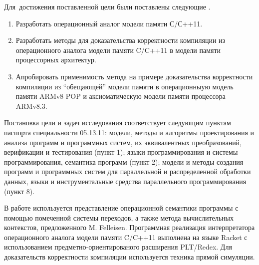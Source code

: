 Для~достижения поставленной цели были поставлены следующие {\tasks}.
\begin{enumerate}
  \item Разработать операционный аналог модели памяти С/С++11.
  \item Разработать методы для доказательства корректности компиляции из операционного аналога модели памяти C/C++11 в модели памяти
        процессорных архитектур.
  \item Апробировать применимость метода на примере доказательства корректности компиляции из ``обещающей'' модели памяти в
        операционныую модель памяти ARMv8 POP и аксиоматическую модели памяти процессора ARMv8.3.
\end{enumerate}

Постановка цели и задач исследования соответствует следующим пунктам паспорта специальности 05.13.11:
модели, методы и алгоритмы проектирования и анализа программ и программных систем, их эквивалентных преобразований, верификации и тестирования (пункт 1);
языки программирования и системы программирования, семантика программ (пункт 2);
модели и методы создания программ и программных систем для параллельной и распределенной обработки данных,
языки и инструментальные средства параллельного программирования (пункт 8).

{\methods}
В работе используется представление операционной семантики программы с помощью помеченной системы переходов, а также
метода вычислительных контекстов, предложенного M. Felleisen.
Программная реализация интерпретатора операционного аналога модели памяти C/C++11 выполнена на языке Racket с использованием
предметно-ориентированого расширения PLT/Redex.
Для доказательств корректности компиляции используется техника прямой симуляции.

